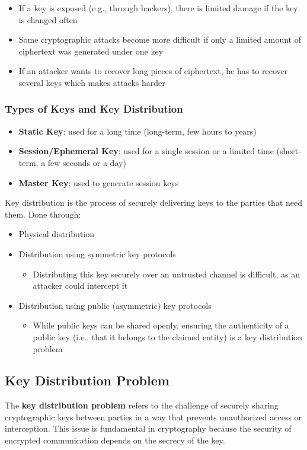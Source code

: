 \begin{itemize}
    \item If a key is exposed (e.g., through hackers), there is limited
    damage if the key is changed often
    \item Some cryptographic attacks become more difficult if only a
    limited amount of ciphertext was generated under one key
    \item If an attacker wants to recover long pieces of ciphertext, he has
    to recover several keys which makes attacks harder
\end{itemize}

\subsubsection{Types of Keys and Key Distribution}
\begin{itemize}
    \item \textbf{Static Key}: used for a long time (long-term, few hours to years)
    \item \textbf{Session/Ephemeral Key}: used for a single session or a limited time (short-term, a few seconds or a day)
    \item \textbf{Master Key}: used to generate session keys
\end{itemize}

Key distribution is the process of securely delivering keys to the parties that need them. Done through:
\begin{itemize}
    \item Physical distribution
    \item Distribution using symmetric key protocols 
    \begin{itemize}
        \item Distributing this key securely over an untrusted channel is difficult, as an attacker could intercept it
    \end{itemize}
    \item Distribution using public (asymmetric) key protocols
    \begin{itemize}
        \item While public keys can be shared openly, ensuring the authenticity of a public key (i.e., that it belongs to the claimed entity) is a key distribution problem
    \end{itemize}
\end{itemize}

\subsection{Key Distribution Problem}
The \textbf{key distribution problem} refers to the challenge of securely sharing cryptographic keys between parties in a way that prevents unauthorized access or interception. 
This issue is fundamental in cryptography because the security of encrypted communication depends on the secrecy of the key. \\

